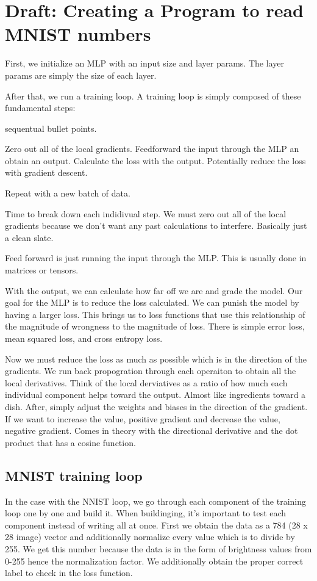 \section{Draft: Creating a Program to read MNIST numbers}

First, we initialize an MLP with an input size and layer params. The layer params are 
simply the size of each layer. 

After that, we run a training loop. A training loop is simply composed of these fundamental steps:

sequentual bullet points.

Zero out all of the local gradients. 
Feedforward the input through the MLP an obtain an output.
Calculate the loss with the output.
Potentially reduce the loss with gradient descent.

Repeat with a new batch of data.

Time to break down each indidivual step.
We must zero out all of the local gradients because we don't want any past calculations to 
interfere. Basically just a clean slate.

Feed forward is just running the input through the MLP. This is usually done in matrices or tensors.

With the output, we can calculate how far off we are and grade the model. Our goal for the MLP is to 
reduce the loss calculated. We can punish the model by having a larger loss. This brings us to loss functions
that use this relationship of the magnitude of wrongness to the magnitude of loss. There is simple error loss,
mean squared loss, and cross entropy loss. 

Now we must reduce the loss as much as possible which is in the direction of the gradients. We run back 
propogration through each operaiton to obtain all the local derivatives. Think of the local derviatives as 
a ratio of how much each individual component helps toward the output. Almost like ingredients toward a dish.
After, simply adjust the weights and biases in the direction of the gradient. If we want to increase the value,
positive gradient and decrease the value, negative gradient. Comes in theory with the directional derivative and 
the dot product that has a cosine function. 

\subsection{MNIST training loop}

In the case with the NNIST loop, we go through each component of the training loop one by one and build it.
When buildinging, it's important to test each component instead of writing all at once. First we obtain the data
as a 784 (28 x 28 image) vector and additionally normalize every value which is to divide by 255. We get this number 
because the data is in the form of brightness values from 0-255 hence the normalization factor. We additionally obtain 
the proper correct label to check in the loss function. 

